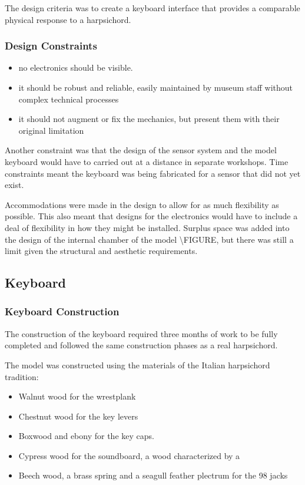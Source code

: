 The design criteria was to create a keyboard interface that provides a
comparable physical response to a harpsichord.

\subsubsection{Design Constraints}\label{design-constraints}

\begin{itemize}
\item
  no electronics should be visible.
\item
  it should be robust and reliable, easily maintained by museum staff
  without complex technical processes
\item
  it should not augment or fix the mechanics, but present them with
  their original limitation
\end{itemize}

Another constraint was that the design of the sensor system and the
model keyboard would have to carried out at a distance in separate
workshops. Time constraints meant the keyboard was being fabricated for
a sensor that did not yet exist.

Accommodations were made in the design to allow for as much flexibility
as possible. This also meant that designs for the electronics would have
to include a deal of flexibility in how they might be installed. Surplus
space was added into the design of the internal chamber of the model
\textbackslash FIGURE, but there was still a limit given the structural
and aesthetic requirements.

\subsection{Keyboard}\label{keyboard}

\subsubsection{Keyboard Construction}\label{keyboard-construction}
The construction of the keyboard required three months of work to be fully completed
and followed the same construction phases as a real harpsichord.

The model was constructed using the materials of the Italian harpsichord
tradition:

\begin{itemize}
\item
  Walnut wood for the wrestplank
\item
  Chestnut wood for the key levers
\item
  Boxwood and ebony for the key caps.
\item
  Cypress wood for the soundboard, a wood characterized by a
\item
  Beech wood, a brass spring and a seagull feather plectrum for the 98 jacks
\end{itemize}

